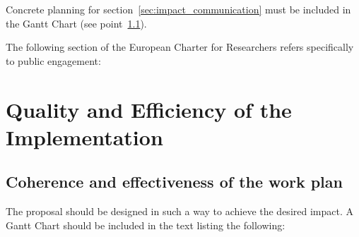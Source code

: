 \medskip\noindent
Concrete planning for section~\ref{sec:impact_communication} must be included in the Gantt Chart (see point~\ref{sec:implementation_work_plan}).

\medskip\noindent
The following section of the European Charter for Researchers refers specifically to public engagement:

\bigskip\noindent
\setlength{\fboxsep}{3mm}





\newpage
\section{Quality and Efficiency of the Implementation}
\label{sec:implementation}

\subsection{Coherence and effectiveness of the work plan}
\label{sec:implementation_work_plan}

The proposal should be designed in such a way to achieve the desired impact. 
A Gantt Chart should be included in the text listing the following:

